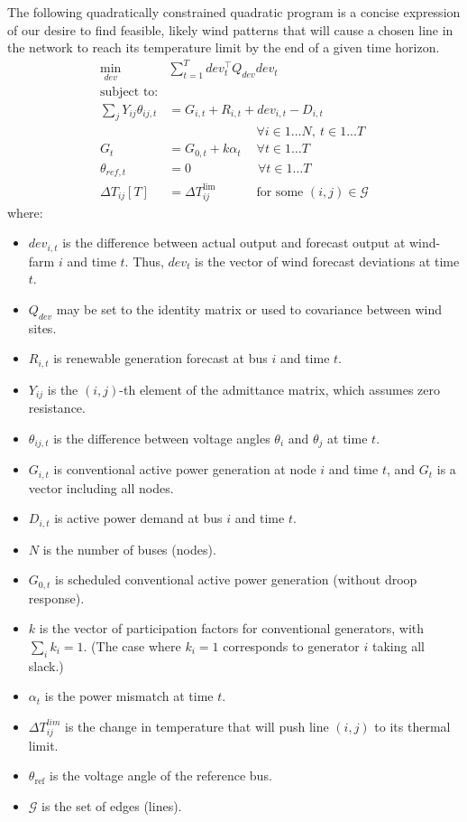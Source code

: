 \documentclass[conference]{IEEEtran}
\begin{document}
The following quadratically constrained quadratic program is a concise expression of our desire to find feasible, likely wind patterns that will cause a chosen line in the network to reach its temperature limit by the end of a given time horizon.
\begin{subequations}\label{I:all}
\begin{align}
\label{I:obj}\underset{dev}{\min} \quad & \sum_{t=1}^{T} dev_t^\top Q_{dev} dev_t \\
\nonumber \text{subject to:} & \\
\label{I:flow} \sum_j Y_{ij} \theta_{ij,t} & = G_{i,t} + R_{i,t} +
dev_{i,t} - D_{i,t} \\[-8pt]
\nonumber &\qquad\qquad\qquad\quad \forall i \in 1... N,~t\in 1... T \\%
\label{I:conv} G_t &= G_{0,t} + k\alpha_t \quad\: \forall t\in 1\ldots T \\
\label{I:slack} \theta_{ref,t} & = 0 \qquad\qquad\quad\; \forall t\in 1\ldots T \\
\label{I:lim} \Delta T_{ij}[T] &= \Delta T_{ij}^\text{lim}\qquad\quad\: \text{for some }(i,j)\in \mathcal{G}
\end{align}
\end{subequations}
where:
\begin{itemize}
\itemsep1pt\parskip0pt
\item $dev_{i,t}$ is the difference between actual output and forecast output at wind-farm $i$ and time $t$. Thus, $dev_t$ is the vector of wind forecast deviations at time $t$.
\item $Q_{dev}$ may be set to the identity matrix or used to covariance between wind sites.
\item $R_{i,t}$ is renewable generation forecast at bus $i$ and time $t$.
\item $Y_{ij}$ is the $(i,j)$-th element of the admittance matrix, which assumes zero resistance.
\item $\theta_{ij,t}$ is the difference between voltage angles $\theta_i$ and $\theta_j$ at time $t$.
\item $G_{i,t}$ is conventional active power generation at node $i$ and time $t$, and $G_t$ is a vector including all nodes.
\item $D_{i,t}$ is active power demand at bus $i$ and time $t$.
\item $N$ is the number of buses (nodes).
\item $G_{0,t}$ is scheduled conventional active power generation (without droop response).
\item $k$ is the vector of participation factors for conventional generators, with $\sum_i k_i = 1$. (The case where $k_i=1$ corresponds to generator $i$ taking all slack.)
\item $\alpha_t$ is the power mismatch at time $t$.
\item $\Delta T_{ij}^{lim}$ is the change in temperature that will push line $(i,j)$ to its thermal limit.
\item $\theta_\text{ref}$ is the voltage angle of the reference bus.
\item $\mathcal{G}$ is the set of edges (lines).
\end{itemize}
\end{document}
